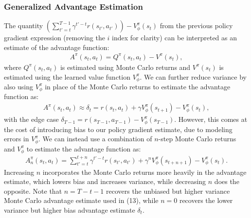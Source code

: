 \documentclass{article}
\begin{document}
\subsubsection{Generalized Advantage Estimation}
The quantity $\left(\sum_{t'=t}^{T-1} \gamma^{t'-t} r(s_{t'}, a_{t'})\right) - V_\phi^\pi\left(s_{t}\right)$ from the previous policy gradient expression (removing the $i$ index for clarity) can be interpreted as an estimate of the advantage function:
\begin{align}
A^\pi(s_{t}, a_{t}) = Q^\pi(s_{t}, a_{t}) - V^\pi(s_{t}),
\end{align}
where $Q^\pi(s_{t}, a_{t})$ is estimated using Monte Carlo returns and $V^\pi(s_{t})$ is estimated using the learned value function $V_\phi^\pi$. We can further reduce variance by also using $V_\phi^\pi$ in place of the Monte Carlo returns to estimate the advantage function as:
\begin{align}
A^\pi(s_{t}, a_{t}) \approx \delta_t = r(s_{t}, a_{t}) + \gamma V_\phi^\pi(s_{t+1}) - V_\phi^\pi(s_{t}),
\end{align}
with the edge case $\delta_{T-1} = r(s_{T-1}, a_{T-1}) - V_\phi^\pi(s_{T-1})$. However, this comes at the cost of introducing bias to our policy gradient estimate, due to modeling errors in $V_\phi^\pi$. We can instead use a combination of $n$-step Monte Carlo returns and $V_\phi^\pi$ to estimate the advantage function as:
\begin{align}
A_n^\pi(s_{t}, a_{t}) = \sum_{t'=t}^{t+n} \gamma^{t'-t} r(s_{t'}, a_{t'}) + \gamma^n V_\phi^\pi(s_{t+n+1}) - V_\phi^\pi(s_{t}).
\end{align}
Increasing $n$ incorporates the Monte Carlo returns more heavily in the advantage estimate, which lowers bias and increases variance, while decreasing $n$ does the opposite. Note that $n=T - t - 1$ recovers the unbiased but higher variance Monte Carlo advantage estimate used in (13), while $n=0$ recovers the lower variance but higher bias advantage estimate $\delta_t$.
\end{document}
